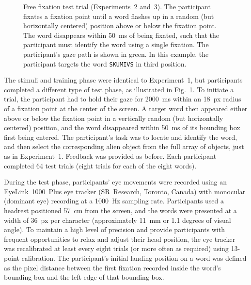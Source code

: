 \documentclass[doc,biblatex,floatsintext]{apa7}
\begin{document}
\begin{figure}
\vspace*{2pt}
\caption{Free fixation test trial (Experiments~2 and~3). The participant fixates a fixation point until a word flashes up in a random (but horizontally centered) position above or below the fixation point. The word disappears within 50~ms of being fixated, such that the participant must identify the word using a single fixation. The participant's gaze path is shown in green. In this example, the participant targets the word \texttt{SKUMIVS} in third position.}
\label{fig09}
\end{figure}

The stimuli and training phase were identical to Experiment~1, but participants completed a different type of test phase, as illustrated in Fig.~\ref{fig09}. To initiate a trial, the participant had to hold their gaze for 2000~ms within an 18~px radius of a fixation point at the center of the screen. A target word then appeared either above or below the fixation point in a vertically random (but horizontally centered) position, and the word disappeared within 50~ms of its bounding box first being entered. The participant's task was to locate and identify the word, and then select the corresponding alien object from the full array of objects, just as in Experiment~1. Feedback was provided as before. Each participant completed 64 test trials (eight trials for each of the eight words).

During the test phase, participants' eye movements were recorded using an EyeLink~1000~Plus eye tracker (SR~Research, Toronto, Canada) with monocular (dominant eye) recording at a 1000~Hz sampling rate. Participants used a headrest positioned 57~cm from the screen, and the words were presented at a width of 36~px per character (approximately 11~mm or 1.1 degrees of visual angle). To maintain a high level of precision and provide participants with frequent opportunities to relax and adjust their head position, the eye tracker was recalibrated at least every eight trials (or more often as required) using 13-point calibration. The participant's initial landing position on a word was defined as the pixel distance between the first fixation recorded inside the word's bounding box and the left edge of that bounding box.
\end{document}
